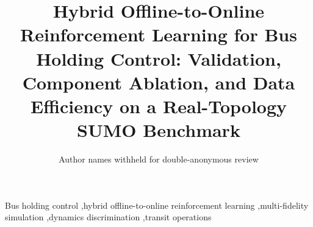 \documentclass[preprint,12pt,authoryear]{elsarticle}
\date{}
\begin{document}
\begin{frontmatter}

\title{Hybrid Offline-to-Online Reinforcement Learning for Bus Holding Control: Validation, Component Ablation, and Data Efficiency on a Real-Topology SUMO Benchmark}

\author{Author names withheld for double-anonymous review}




\begin{keyword}
Bus holding control \sep hybrid offline-to-online reinforcement learning \sep multi-fidelity simulation \sep dynamics discrimination \sep transit operations
\end{keyword}

\end{frontmatter}










\appendix




\end{document}
